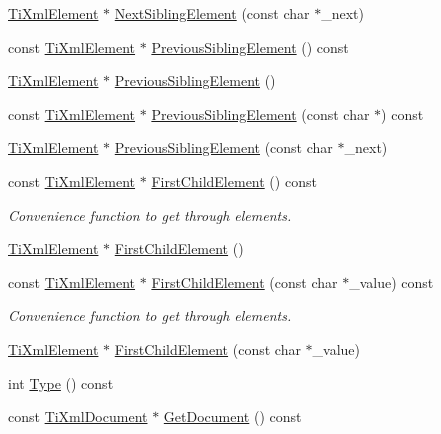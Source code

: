 \begin{DoxyCompactItemize}
\item 
\hyperlink{class_ti_xml_element}{TiXmlElement} $\ast$ \hyperlink{class_ti_xml_node_a6e1ac6b800e18049bc75e9f8e63a8e5f}{NextSiblingElement} (const char $\ast$\_\-next)
\item 
const \hyperlink{class_ti_xml_element}{TiXmlElement} $\ast$ \hyperlink{class_ti_xml_node_a37d2f0359c5e2d82141646d969bc8666}{PreviousSiblingElement} () const 
\item 
\hyperlink{class_ti_xml_element}{TiXmlElement} $\ast$ \hyperlink{class_ti_xml_node_a9f7092efa127c3190df5cf3cb97e887d}{PreviousSiblingElement} ()
\item 
const \hyperlink{class_ti_xml_element}{TiXmlElement} $\ast$ \hyperlink{class_ti_xml_node_ab6997616e51877d861676159c9bd345a}{PreviousSiblingElement} (const char $\ast$) const 
\item 
\hyperlink{class_ti_xml_element}{TiXmlElement} $\ast$ \hyperlink{class_ti_xml_node_a976f74fdd0e49a53502ebf1eda8e63a9}{PreviousSiblingElement} (const char $\ast$\_\-next)
\item 
const \hyperlink{class_ti_xml_element}{TiXmlElement} $\ast$ \hyperlink{class_ti_xml_node_ab1f8d8e70d88aea4c5efedfe00862d55}{FirstChildElement} () const 
\begin{DoxyCompactList}\small\item\em Convenience function to get through elements. \item\end{DoxyCompactList}\item 
\hyperlink{class_ti_xml_element}{TiXmlElement} $\ast$ \hyperlink{class_ti_xml_node_aa0fecff1f3866ab33a8a25506e95db1d}{FirstChildElement} ()
\item 
const \hyperlink{class_ti_xml_element}{TiXmlElement} $\ast$ \hyperlink{class_ti_xml_node_a0ec361bfef1cf1978d060295f597e0d9}{FirstChildElement} (const char $\ast$\_\-value) const 
\begin{DoxyCompactList}\small\item\em Convenience function to get through elements. \item\end{DoxyCompactList}\item 
\hyperlink{class_ti_xml_element}{TiXmlElement} $\ast$ \hyperlink{class_ti_xml_node_a6936ae323675071808ac4840379e57f5}{FirstChildElement} (const char $\ast$\_\-value)
\item 
int \hyperlink{class_ti_xml_node_a57b99d5c97d67a42b9752f5210a1ba5e}{Type} () const 
\item 
const \hyperlink{class_ti_xml_document}{TiXmlDocument} $\ast$ \hyperlink{class_ti_xml_node_aa66f4ebcd175204a168ed7c2d7b43071}{GetDocument} () const 

\end{DoxyCompactItemize}
